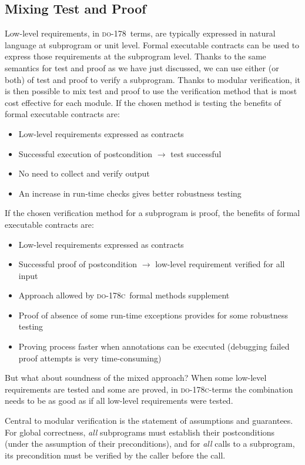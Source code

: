 \documentclass[sttt,final]{svjour}
\newcommand{\DO}{\textsc{do-178}}
\newcommand{\DOC}{\textsc{do-178c}}
\begin{document}
\subsection{Mixing Test and Proof}

Low-level requirements, in \DO\ terms, are typically expressed in
natural language at subprogram or unit level. Formal executable
contracts can be used to express those requirements at the
subprogram level. Thanks to the same semantics for test and proof as
we have just discussed, we can use either (or both) of test and proof
to verify a subprogram. Thanks to modular verification, it is then
possible to mix test and proof to use the verification method that is
most cost effective for each module. If the chosen method is testing
the benefits of formal executable contracts are:
%
\begin{itemize}
\item Low-level requirements expressed as contracts
\item Successful execution of postcondition $\rightarrow$ test successful
\item No need to collect and verify output
\item An increase in run-time checks gives better robustness testing
\end{itemize}
If the chosen verification method for a subprogram is proof, the
benefits of formal executable contracts are:
\begin{itemize}
\item Low-level requirements expressed as contracts
\item Successful proof of postcondition $\rightarrow$ low-level
  requirement verified for all input
\item Approach allowed by \DOC\ formal methods supplement
\item Proof of absence of some run-time exceptions provides for some
  robustness testing
\item Proving process faster when annotations can be executed (debugging failed proof attempts is very time-consuming)
\end{itemize}
%
But what about soundness of the mixed approach? When some low-level
requirements are tested and some are proved, in
\DOC-terms the combination needs to be as good as if all low-level
requirements were tested.

Central to modular verification is the statement of assumptions and
guarantees. For global correctness, \emph{all} subprograms must
establish their postconditions (under the assumption of their
preconditions), and for \emph{all} calls to a subprogram, its
precondition must be verified by the caller before the call.
\end{document}
